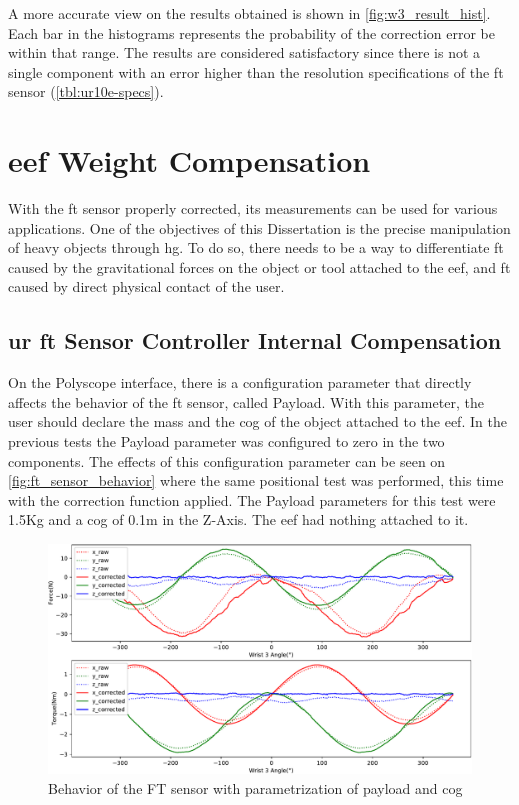\par A more accurate view on the results obtained is shown in \autoref{fig:w3_result_hist}. Each bar in the histograms represents the probability of the correction error be within that range. The results are considered satisfactory since there is not a single component with an error higher than the resolution specifications of the \ac{ft} sensor (\autoref{tbl:ur10e-specs}).





\section{\ac{eef} Weight Compensation}
\label{sec:weight_comp}

\par With the \ac{ft} sensor properly corrected, its measurements can be used for various applications. One of the objectives of this Dissertation is the precise manipulation of heavy objects through \ac{hg}. To do so, there needs to be a way to differentiate \ac{ft} caused by the gravitational forces on the object or tool attached to the \ac{eef}, and \ac{ft} caused by direct physical contact of the user. 

\subsection{\acs{ur} \acs{ft} Sensor Controller Internal Compensation}
\label{ssec:ft_internal_comp}

\par On the Polyscope interface, there is a configuration parameter that directly affects the behavior of the \ac{ft} sensor, called Payload. With this parameter, the user should declare the mass and the \ac{cog} of the object attached to the \ac{eef}. In the previous tests the Payload parameter was configured to zero in the two components. The effects of this configuration parameter can be seen on \autoref{fig:ft_sensor_behavior} where the same positional test was performed, this time with the correction function applied. The Payload parameters for this test were 1.5Kg and a \ac{cog} of 0.1m in the Z-Axis. The \ac{eef} had nothing attached to it.

\begin{figure}[h]
    \centering
    \includegraphics[width=0.8\linewidth]{figs/chp3/ft_sensor_behavior.pdf}
    \caption{Behavior of the FT sensor with parametrization of payload and cog }
    \label{fig:ft_sensor_behavior}
\end{figure}

